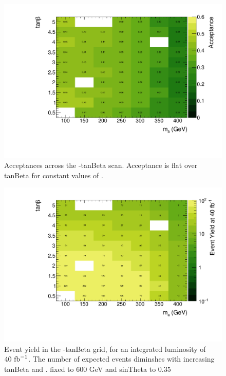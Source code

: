 \begin{figure}
\includegraphics[width=\textwidth]{texinputs/04_grid/figures/monoz/leptonic/tanbma_ae_ll.pdf}
\caption{Acceptances across the \ma-tanBeta scan.  Acceptance is flat over tanBeta for constant values of \ma.}
\end{figure}

\begin{figure}
\includegraphics[width=\textwidth]{texinputs/04_grid/figures/monoz/leptonic/tanbma_yield_ll.pdf}
\caption{Event yield in the \ma-tanBeta grid, for an integrated luminosity of $40~\rm{fb}^{-1}$.  The number of expected events diminshes with increasing tanBeta and \ma.  \mA fixed to 600 GeV and sinTheta to 0.35}
\end{figure}


